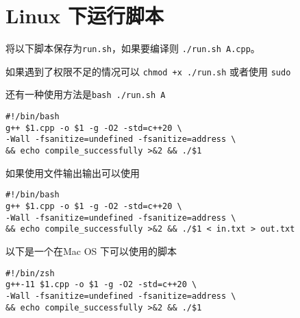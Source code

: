\section{Linux 下运行脚本}

将以下脚本保存为\verb|run.sh|，如果要编译则 \verb|./run.sh A.cpp|。

如果遇到了权限不足的情况可以 \verb|chmod +x ./run.sh| 或者使用 \verb|sudo|

还有一种使用方法是\verb|bash ./run.sh A|

\begin{lstlisting}
#!/bin/bash
g++ $1.cpp -o $1 -g -O2 -std=c++20 \
-Wall -fsanitize=undefined -fsanitize=address \
&& echo compile_successfully >&2 && ./$1
\end{lstlisting}

如果使用文件输出输出可以使用
\begin{lstlisting}
#!/bin/bash
g++ $1.cpp -o $1 -g -O2 -std=c++20 \
-Wall -fsanitize=undefined -fsanitize=address \
&& echo compile_successfully >&2 && ./$1 < in.txt > out.txt
\end{lstlisting}

以下是一个在Mac OS 下可以使用的脚本
\begin{lstlisting}
#!/bin/zsh
g++-11 $1.cpp -o $1 -g -O2 -std=c++20 \
-Wall -fsanitize=undefined -fsanitize=address \
&& echo compile_successfully >&2 && ./$1
\end{lstlisting}